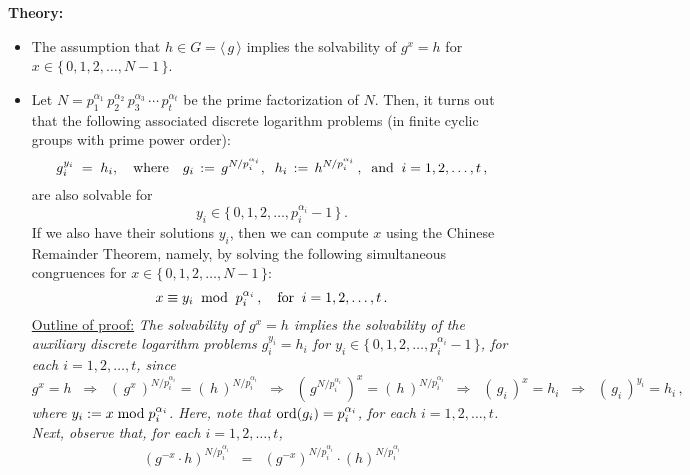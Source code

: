 \noindent
\textbf{Theory:}
\begin{itemize}
\item	The assumption that $h \in G = \langle\,g\,\rangle$ implies the solvability of $g^{x} = h$ for $x \in \{\,0,1,2,\ldots,N-1\,\}$.
\item	Let $N = p_{1}^{\alpha_{1}}\,p_{2}^{\alpha_{2}}\,p_{3}^{\alpha_{3}}\,\cdots\,p_{t}^{\alpha_{t}}$ be the prime factorization of $N$.
		Then, it turns out that the following associated discrete logarithm problems (in finite cyclic groups with prime power order):
		\begin{equation*}
		g_{i}^{y_{i}} \; = \; h_{i},
		\quad\textnormal{where}\quad g_{i} \, := \, g^{N/p_{i}^{\alpha_{i}}},
		\;\;
		h_{i} \, := \, h^{N/p_{i}^{\alpha_{i}}}\,,
		\;\;\textnormal{and}\;\;
		i = 1,2,\ldots,t\,,
		\end{equation*}
		are also solvable for
		\begin{equation*}
		y_{i} \in \{\,0,1,2,\ldots,p_{i}^{\alpha_{i}}-1\,\}\,.
		\end{equation*}
		If we also have their solutions $y_{i}$,  then we can compute $x$ using the Chinese Remainder Theorem,
		namely, by solving the following simultaneous congruences for $x \in \{\,0,1,2,\ldots,N-1\,\}$:
		\begin{equation*}
		x \equiv y_{i}\;\;\textnormal{mod}\;\;p_{i}^{\alpha_{i}}\,,
		\quad\textnormal{for}\;\; i = 1,2,\ldots,t\,.
		\end{equation*}
		\underline{Outline of proof:}\vskip 0.1cm
		\textit{The solvability of $g^{x} = h$ implies the solvability of the auxiliary discrete logarithm problems
		$g_{i}^{y_{i}} = h_{i}$ for $y_{i} \in \{\,0,1,2,\ldots,p_{i}^{\alpha_{i}}-1\,\}$, for each $i = 1,2,\ldots,t$, since
		\begin{equation*}
		g^{x} = h
		\;\;\Longrightarrow\;\; \left(\,g^{x}\,\right)^{N/p_{i}^{\alpha_{i}}} = \left(\,h\,\right)^{N/p_{i}^{\alpha_{i}}}
		\;\;\Longrightarrow\;\; \left(\,g^{N/p_{i}^{\alpha_{i}}}\,\right)^{x} = \left(\,h\,\right)^{N/p_{i}^{\alpha_{i}}}
		\;\;\Longrightarrow\;\; \left(\,g_{i}\,\right)^{x} = h_{i}
		\;\;\Longrightarrow\;\; \left(\,g_{i}\,\right)^{y_{i}} = h_{i}\,,
		\end{equation*}
		where $y_{i} := x \; \textnormal{mod} \; p_{i}^{\alpha_{i}}$.
		Here, note that $\textnormal{ord}(g_{i}) = p_{i}^{\alpha_{i}}$, for each $i = 1,2,\ldots,t$.
		Next, observe that, for each $i = 1,2,\ldots,t$,
		\begin{eqnarray*}
		\left(g^{-x}\cdot h\right)^{N/p_{i}^{\alpha_{i}}}
		&=& \left(g^{-x}\right)^{N/p_{i}^{\alpha_{i}}} \cdot \left(h\right)^{N/p_{i}^{\alpha_{i}}}

\end{eqnarray*}}
\end{itemize}
